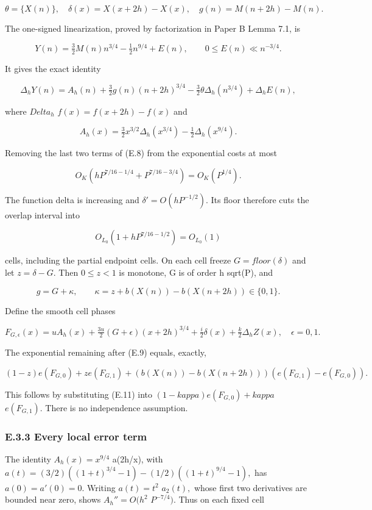 \documentclass[11pt,a4paper]{article}
\begin{document}
\[
 \theta=\{X(n)\},\quad \delta(x)=X(x+2h)-X(x),\quad
 g(n)=M(n+2h)-M(n).
\]

The one-signed linearization, proved by factorization in Paper B Lemma
7.1, is

\[
 Y(n)=\tfrac32 M(n)n^{3/4}-\tfrac12n^{9/4}+E(n),\qquad
 0\le E(n)\ll n^{-3/4}.
\]

It gives the exact identity

\[
 \Delta_hY(n)=A_h(n)+\tfrac32g(n)(n+2h)^{3/4}
       -\tfrac32\theta\Delta_h(n^{3/4})+\Delta_hE(n),
 \tag{E.8}
\]

where \(Delta_h\) \(f(x)=f(x+2h)-f(x)\) and

\[
 A_h(x)=\tfrac32x^{3/2}\Delta_h(x^{3/4})
                         -\tfrac12\Delta_h(x^{9/4}).
\]

Removing the last two terms of (E.8) from the exponential costs at most

\[
 O_K\left(hP^{7/16-1/4}+P^{7/16-3/4}\right)=O_K(P^{1/4}).
 \tag{E.9}
\]

The function delta is increasing and \(\delta'=O(hP^{-1/2}).\) Its floor
therefore cuts the overlap interval into

\[
 O_{L_0}(1+hP^{7/16-1/2})=O_{L_0}(1)
 \tag{E.10}
\]

cells, including the partial endpoint cells. On each cell freeze
\(G=floor(\delta)\) and let \(z=\delta-G.\) Then \(0\le z<1\) is
monotone, G is of order h sqrt(P), and

\[
 g=G+\kappa,\qquad
 \kappa=z+b(X(n))-b(X(n+2h))\in\{0,1\}.
 \tag{E.11}
\]

Define the smooth cell phases

\[
 F_{G,\epsilon}(x)=u A_h(x)+\tfrac{3u}{2}(G+\epsilon)(x+2h)^{3/4}
        +\tfrac i2\delta(x)+\tfrac k2\Delta_hZ(x),\quad \epsilon=0,1.
\]

The exponential remaining after (E.9) equals, exactly,

\[
 (1-z)e(F_{G,0})+z e(F_{G,1})+
 (b(X(n))-b(X(n+2h)))(e(F_{G,1})-e(F_{G,0})).
 \tag{E.12}
\]

This follows by substituting (E.11) into \((1-kappa)e(F_{G,0})+kappa\)
\(e(F_{G,1}).\) There is no independence assumption.

\subsubsection{E.3.3 Every local error
term}\label{e.3.3-every-local-error-term}

The identity \(A_h(x)=x^{9/4}\) a(2h/x), with
\(a(t)=(3/2)((1+t)^{3/4}-1)-(1/2)((1+t)^{9/4}-1),\) has
\(a(0)=a'(0)=0.\) Writing \(a(t)=t^2\) \(a_2(t),\) whose first two
derivatives are bounded near zero, shows \(A_h''=O(h^2\) \(P^{-7/4}).\)
Thus on each fixed cell
\end{document}

